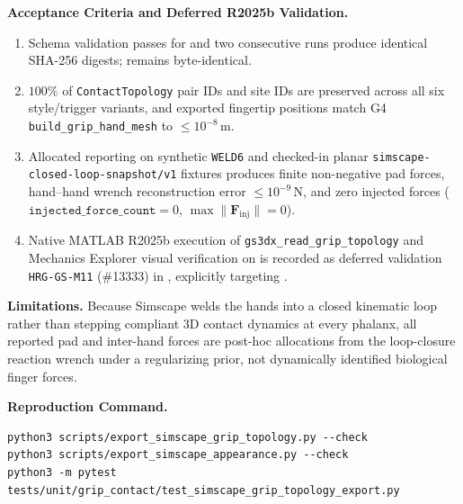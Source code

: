 \documentclass[11pt,a4paper]{article}
\begin{document}
\textbf{Acceptance Criteria and Deferred R2025b Validation.}
\begin{enumerate}[leftmargin=*,noitemsep]
\item Schema validation passes for  and two consecutive runs produce identical SHA-256 digests;  remains byte-identical.
\item $100\%$ of \texttt{ContactTopology} pair IDs and site IDs are preserved across all six style/trigger variants, and exported fingertip positions match G4 \texttt{build\_grip\_hand\_mesh} to $\le 10^{-8}$\,m.
\item Allocated reporting on synthetic \texttt{WELD6} and checked-in planar \texttt{simscape-closed-loop-snapshot/v1} fixtures produces finite non-negative pad forces, hand--hand wrench reconstruction error $\le 10^{-9}$\,N, and zero injected forces ($\texttt{injected\_force\_count} = 0$, $\max \|\mathbf{F}_{\mathrm{inj}}\| = 0$).
\item Native MATLAB R2025b execution of \texttt{gs3dx\_read\_grip\_topology} and Mechanics Explorer visual verification on  is recorded as deferred validation \texttt{HRG-GS-M11} (\#13333) in , explicitly targeting .
\end{enumerate}

\textbf{Limitations.}
Because Simscape  welds the hands into a closed kinematic loop rather than stepping compliant 3D contact dynamics at every phalanx, all reported pad and inter-hand forces are post-hoc allocations from the loop-closure reaction wrench under a regularizing prior, not dynamically identified biological finger forces.

\textbf{Reproduction Command.}
\begin{verbatim}
python3 scripts/export_simscape_grip_topology.py --check
python3 scripts/export_simscape_appearance.py --check
python3 -m pytest tests/unit/grip_contact/test_simscape_grip_topology_export.py
\end{verbatim}
\end{document}
